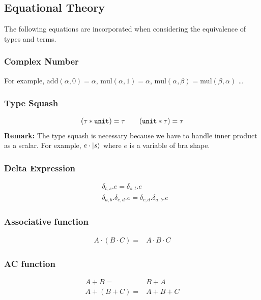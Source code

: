 

\subsection{Equational Theory}
The following equations are incorporated when considering the equivalence of types and terms.

\subsubsection*{Complex Number}
For example, $\mathrm{add}(\alpha, 0) = \alpha$, $\mathrm{mul}(\alpha, 1) = \alpha$, $\mathrm{mul}(\alpha, \beta) = \mathrm{mul}(\beta, \alpha)$ \dots

\subsubsection*{Type Squash}
\begin{gather*}
  (\tau * \texttt{unit})  = \tau \qquad (\texttt{unit} * \tau) = \tau \\
\end{gather*}
\textbf{Remark:} The type squash is necessary because we have to handle inner product as a scalar. For example, $e \cdot |s\rangle$ where $e$ is a variable of bra shape.

\subsubsection*{Delta Expression}
\begin{align*}
    & \delta_{t, s}.e = \delta_{s, t}.e \\
    & \delta_{a, b}.\delta_{c, d}.e = \delta_{c, d}.\delta_{a, b}.e
\end{align*}

\subsubsection*{Associative function}
\begin{align*}
    A \cdot (B \cdot C) = & A \cdot B \cdot C
\end{align*}

\subsubsection*{AC function}
\begin{align*}
    A + B = & B + A \\
    A + (B + C) = & A + B + C \\
\end{align*}

